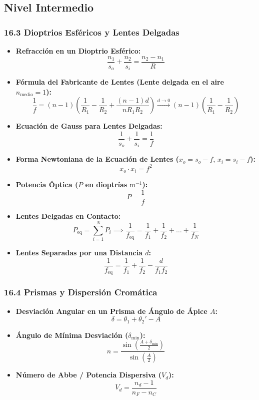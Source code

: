\documentclass[11pt,a4paper]{article}
\begin{document}
\subsection*{Nivel Intermedio}

\subsubsection*{16.3 Dioptrios Esféricos y Lentes Delgadas}

\begin{itemize}
  \item \textbf{Refracción en un Dioptrio Esférico:}
  \[
    \frac{n_1}{s_o} + \frac{n_2}{s_i} = \frac{n_2 - n_1}{R}
  \]
  \item \textbf{Fórmula del Fabricante de Lentes (Lente delgada en el aire $n_{\text{medio}} = 1$):}
  \[
    \frac{1}{f} = (n - 1)\left( \frac{1}{R_1} - \frac{1}{R_2} + \frac{(n - 1)d}{n R_1 R_2} \right) \xrightarrow{d \to 0} (n - 1)\left( \frac{1}{R_1} - \frac{1}{R_2} \right)
  \]
  \item \textbf{Ecuación de Gauss para Lentes Delgadas:}
  \[
    \frac{1}{s_o} + \frac{1}{s_i} = \frac{1}{f}
  \]
  \item \textbf{Forma Newtoniana de la Ecuación de Lentes ($x_o = s_o - f, \, x_i = s_i - f$):}
  \[
    x_o \cdot x_i = f^2
  \]
  \item \textbf{Potencia Óptica ($P$ en dioptrías $\text{m}^{-1}$):}
  \[
    P = \frac{1}{f}
  \]
  \item \textbf{Lentes Delgadas en Contacto:}
  \[
    P_{\text{eq}} = \sum_{i=1}^N P_i \implies \frac{1}{f_{\text{eq}}} = \frac{1}{f_1} + \frac{1}{f_2} + \dots + \frac{1}{f_N}
  \]
  \item \textbf{Lentes Separadas por una Distancia $d$:}
  \[
    \frac{1}{f_{\text{eq}}} = \frac{1}{f_1} + \frac{1}{f_2} - \frac{d}{f_1 f_2}
  \]
\end{itemize}

\subsubsection*{16.4 Prismas y Dispersión Cromática}

\begin{itemize}
  \item \textbf{Desviación Angular en un Prisma de Ángulo de Ápice $A$:}
  \[
    \delta = \theta_1 + \theta_2' - A
  \]
  \item \textbf{Ángulo de Mínima Desviación ($\delta_{\min}$):}
  \[
    n = \frac{\sin\left( \frac{A + \delta_{\min}}{2} \right)}{\sin\left( \frac{A}{2} \right)}
  \]
  \item \textbf{Número de Abbe / Potencia Dispersiva ($V_d$):}
  \[
    V_d = \frac{n_d - 1}{n_F - n_C}
  \]
\end{itemize}
\end{document}
